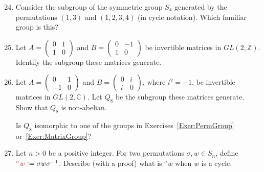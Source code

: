 \documentclass[12pt]{article}
\newcommand{\CC}{{\mathbb C}}
\newcommand{\ZZ}{{\mathbb Z}}
\def\defcolor#1{{\color{Maroon}#1}}
\begin{document}
\begin{enumerate}
\setcounter{enumi}{23}

\item \label{Exer:PermGroup}
  Consider the subgroup of the symmetric group $S_4$ generated by the permutations $(1,3)$ and $(1,2,3,4)$ (in cycle
  notation).
  Which familiar group is this?

\item\label{Exer:MatrixGroup}
  Let $A=\left(\begin{matrix} 0&1\\1&0\end{matrix}\right)$ and
  $B=\left(\begin{matrix} 0&-1\\1&0\end{matrix}\right)$
  be invertible matrices in $GL(2,\ZZ)$.
  Identify the subgroup these matrices generate.


\item \label{Exer:Q8} Let $A=\left(\begin{matrix} 0&1\\-1&0\end{matrix}\right)$ and
  $B=\left(\begin{matrix} 0&i\\i&0\end{matrix}\right)$, where $i^2=-1$, be invertible matrices in $GL(2,\CC)$.
    Let $Q_8$ be the subgroup these matrices generate.
    Show that $Q_8$ is non-abelian.

    Is $Q_8$ isomorphic to one of the groups in Exercises~\ref{Exer:PermGroup} or~\ref{Exer:MatrixGroup}?


\item
  Let $n>0$ be a positive integer.
  For two permutations $\sigma, w\in S_n$, define $\defcolor{{^\sigma}w}\vcentcolon= \sigma w \sigma^{-1}$.
  Describe (with a proof) what is ${^\sigma}w$ when $w$ is a cycle.


\end{enumerate}
\end{document}
